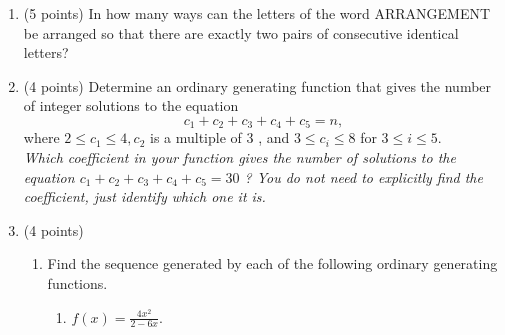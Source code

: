 \documentclass{article}
\begin{document}
\begin{enumerate}
  
  \item (5 points) In how many ways can the letters of the word ARRANGEMENT be arranged so that there are exactly two pairs of consecutive identical letters?
  \begin{answer}
  \end{answer}



  \item (4 points) Determine an ordinary generating function 
  that gives the number of integer solutions to the equation
$$
c_1+c_2+c_3+c_4+c_5=n,
$$
where $2 \leq c_1 \leq 4, c_2$ is a multiple of 3 , and $3 \leq c_i \leq 8$ for $3 \leq i \leq 5$.\\
\textit{Which coefficient in your function gives the number of solutions to 
the equation $c_1+c_2+c_3+c_4+c_5=30$ ? You do not need to explicitly find 
the coefficient, just identify which one it is.}
  \begin{answer}
  \end{answer}

  \item (4 points) 
  \begin{enumerate}
    \item Find the sequence generated by each of the following ordinary generating functions.
    \begin{enumerate}
        \item $f(x)=\frac{4 x^2}{2-6 x}$.
          \begin{answer}
          \end{answer}


\end{enumerate}
\end{enumerate}
\end{enumerate}
\end{document}
